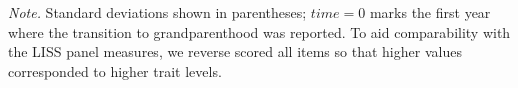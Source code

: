 \documentclass[
  english,
  man, noextraspace]{apa7}
\newenvironment{lltable}{\begin{landscape}\begin{center}\begin{ThreePartTable}}{\end{ThreePartTable}\end{center}\end{landscape}}
\begin{document}
\begin{appendix}
\begin{lltable}
{}

\end{lltable}










\begin{lltable}

\begin{TableNotes}[para]
\normalsize{\textit{Note.} Standard deviations shown in parentheses;
\(time=0\) marks the first year where the transition to grandparenthood
was reported. To aid comparability with the LISS panel measures, we
reverse scored all items so that higher values corresponded to higher
trait levels.}
\end{TableNotes}

\small{

}
\end{lltable}
\end{appendix}
\end{document}
